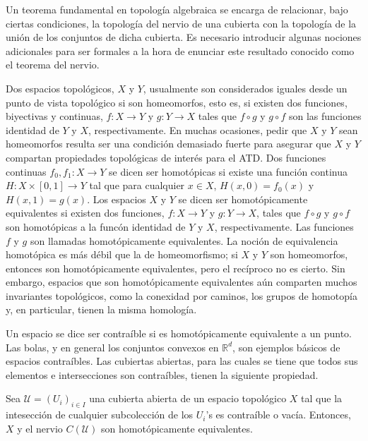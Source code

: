 Un teorema fundamental en topolog\'ia algebraica se encarga de relacionar, bajo ciertas condiciones, la
topolog\'ia del nervio de una cubierta con la topolog\'ia de la uni\'on de los conjuntos
de dicha cubierta. Es necesario introducir algunas nociones adicionales para ser
formales a la hora de enunciar este
resultado conocido como el teorema del nervio.

Dos espacios topol\'ogicos, $X$ y $Y$, usualmente son considerados iguales desde un punto de vista
topol\'ogico si son homeomorfos, esto es, si existen dos funciones, biyectivas y continuas,
$f:X\rightarrow Y$ y $g:Y\rightarrow X$ tales que $f\circ g$ y $g\circ f$ son las funciones
identidad de $Y$ y $X$, respectivamente. En muchas ocasiones, pedir que $X$ y $Y$ sean
homeomorfos resulta ser una condici\'on demasiado fuerte para asegurar que $X$ y $Y$
compartan propiedades topol\'ogicas de inter\'es para el ATD.
Dos funciones continuas $f_{0}, f_{1}:X\rightarrow Y$ se dicen ser homot\'opicas
si existe una funci\'on continua $H:X\times\left[0, 1\right]\rightarrow Y$ tal que para
cualquier $x\in X$, $H\left(x, 0\right) = f_{0}\left(x\right)$ y $H\left(x, 1\right) = g\left(x\right)$.
Los espacios $X$ y $Y$ se dicen ser homot\'opicamente equivalentes si existen
dos funciones, $f:X\rightarrow Y$ y $g:Y\rightarrow X$, tales que $f\circ g$ y $g\circ f$ son
homot\'opicas a la func\'on identidad de $Y$ y $X$, respectivamente.
Las funciones $f$ y $g$ son llamadas homot\'opicamente equivalentes. La noci\'on de
equivalencia homot\'opica es m\'as d\'ebil que la de homeomorfismo; si $X$ y $Y$ son homeomorfos, entonces
son homot\'opicamente equivalentes, pero el rec\'iproco no es cierto. Sin embargo, espacios que son
homot\'opicamente equivalentes a\'un comparten muchos invariantes topol\'ogicos, como la conexidad por
caminos, los grupos de homotop\'ia y, en particular, tienen la misma homolog\'ia.

Un espacio se dice ser contra\'ible si es homot\'opicamente equivalente a un punto. Las bolas, y en
general los conjuntos convexos en $\mathbb{R}^{d}$, son ejemplos b\'asicos de espacios contra\'ibles.
Las cubiertas abiertas, para las cuales se tiene que todos sus elementos e intersecciones son
contra\'ibles, tienen la siguiente propiedad.

\begin{teorema}\label{teoNervio}
    Sea $\mathcal{U} = \left(U_{i}\right)_{i\in I}$ una
    cubierta abierta de un espacio topol\'ogico $X$ tal que la intesecci\'on
    de cualquier subcolecci\'on de los $U_{i}$'s es contra\'ible o vac\'ia.
    Entonces, $X$ y el nervio $C\left(\mathcal{U}\right)$ son
    homot\'opicamente equivalentes.
\end{teorema}

